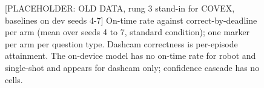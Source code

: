 \documentclass[sigconf]{acmart}
\begin{document}
{\selectfont
\begin{figure}[t]
  \centering
  
  \caption{{[}PLACEHOLDER: OLD DATA, rung 3 stand-in for COVEX, baselines on dev seeds 4-7] On-time rate against correct-by-deadline per arm (mean over seeds 4 to 7, standard condition); one marker per arm per question type. Dashcam correctness is per-episode attainment. The on-device model has no on-time rate for robot and single-shot and appears for dashcam only; confidence cascade has no cells.}
  \label{fig:F2_ontime_vs_correct}
\end{figure}
}


\end{document}
